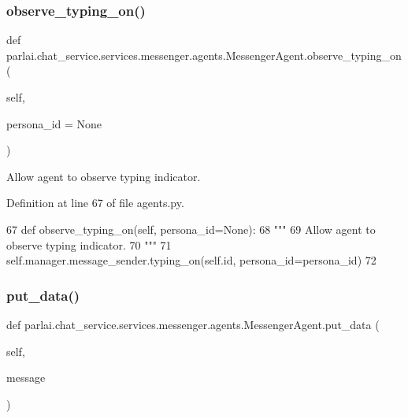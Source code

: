\subsubsection{\texorpdfstring{observe\+\_\+typing\+\_\+on()}{observe\_typing\_on()}}
{\footnotesize\ttfamily def parlai.\+chat\+\_\+service.\+services.\+messenger.\+agents.\+Messenger\+Agent.\+observe\+\_\+typing\+\_\+on (\begin{DoxyParamCaption}\item[{}]{self,  }\item[{}]{persona\+\_\+id = {\ttfamily None} }\end{DoxyParamCaption})}

\begin{DoxyVerb}Allow agent to observe typing indicator.
\end{DoxyVerb}
 

Definition at line 67 of file agents.\+py.


\begin{DoxyCode}
67     \textcolor{keyword}{def }observe\_typing\_on(self, persona\_id=None):
68         \textcolor{stringliteral}{"""}
69 \textcolor{stringliteral}{        Allow agent to observe typing indicator.}
70 \textcolor{stringliteral}{        """}
71         self.manager.message\_sender.typing\_on(self.id, persona\_id=persona\_id)
72 
\end{DoxyCode}
\mbox{\label{classparlai_1_1chat__service_1_1services_1_1messenger_1_1agents_1_1MessengerAgent_a4a050f12b4223f41e1d499c3cb334ca7}} 
\subsubsection{\texorpdfstring{put\+\_\+data()}{put\_data()}}
{\footnotesize\ttfamily def parlai.\+chat\+\_\+service.\+services.\+messenger.\+agents.\+Messenger\+Agent.\+put\+\_\+data (\begin{DoxyParamCaption}\item[{}]{self,  }\item[{}]{message }\end{DoxyParamCaption})}

